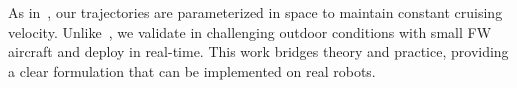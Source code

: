 As in~\cite{hauser1997aggressive, Bry2015AggressiveFO}, our trajectories are parameterized in space to maintain constant cruising velocity. Unlike~\cite{Bry2015AggressiveFO, Liu}, we validate in challenging outdoor conditions with small FW aircraft and deploy in real-time. This work bridges theory and practice, providing a clear formulation that can be implemented on real robots.


